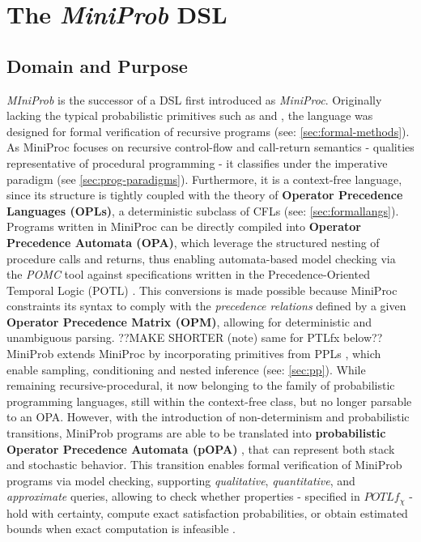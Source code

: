 \label{sec:miniprob}
\chapter{The \textit{MiniProb} DSL}
\section{Domain and Purpose}
\textit{MIniProb} is the successor of a DSL first introduced as \textit{MiniProc}\cite{miniproc}. Originally lacking the typical probabilistic
primitives such as  and , the language was designed for formal verification of recursive programs (see: \ref{sec:formal-methods}). As MiniProc focuses on recursive control-flow and
call-return semantics - qualities representative of procedural programming - it classifies under the imperative paradigm (see \ref{sec:prog-paradigms}). Furthermore, it is a
context-free language, since its structure is tightly coupled with the theory of \textbf{Operator Precedence Languages (OPLs)}, a deterministic subclass of CFLs (see: \ref{sec:formallangs}).
Programs written in MiniProc can be directly compiled into \textbf{Operator Precedence Automata (OPA)}, which leverage the structured nesting of procedure calls and
returns, thus enabling automata-based model checking via the \textit{POMC} tool against specifications written in the Precedence-Oriented Temporal Logic (POTL) \cite{miniproc}.
This conversions is made possible because MiniProc constraints its syntax to comply with the \textit{precedence relations} defined by a given
\textbf{Operator Precedence Matrix (OPM)}, allowing for deterministic and unambiguous parsing.
??MAKE SHORTER (note) same for PTLfx below??
\marginpar{}
\\

MiniProb extends MiniProc by incorporating primitives from PPLs \cite{POPACheck}, which enable sampling, conditioning and nested inference (see: \ref{sec:pp}).
While remaining recursive-procedural, it now belonging to the family of probabilistic programming languages, still within the context-free class, but no longer parsable to an OPA.
However, with the introduction of non-determinism and probabilistic transitions, MiniProb programs are able to be translated into
\textbf{probabilistic Operator Precedence  Automata (pOPA)} \cite{POPACheck,2025modelcheckingprobabilisticoperator}, that can represent both stack and stochastic behavior.
This transition enables formal verification of MiniProb programs via model checking, supporting \emph{qualitative}, \emph{quantitative}, and \emph{approximate} queries,
allowing to check whether properties - specified in $POTLf_\chi$ - hold with certainty, compute exact satisfaction probabilities, or obtain estimated bounds when exact computation is infeasible \cite{guideMiniProb}.

